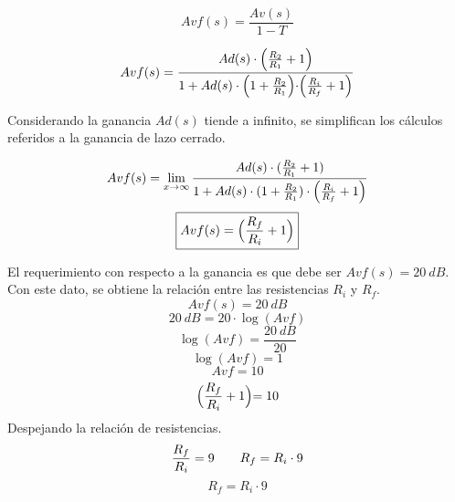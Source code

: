 \begin{equation}
    Avf(s) = \frac{Av(s)}{1-T}
\end{equation}

\begin{equation}
      Avf(s) = \frac{Ad(s)\cdot \Bigl(\frac{R_2}{R_1}+1\Bigl)}{1+Ad(s)\cdot \Bigl(1+\frac{R_2}{R_1}\Bigl)\cdot \Bigl(\frac{R_i}{R_f}+1\Bigl)}
\end{equation}

\bigskip
\hspace{1mm} Considerando la ganancia \(Ad(s)\) tiende a infinito, se simplifican los cálculos referidos a la ganancia de lazo cerrado.

\bigskip
\begin{equation}
      Avf(s) = \lim_{x\to\infty} \frac{Ad(s)\cdot (\frac{R_2}{R_1}+1)}{1+Ad(s)\cdot (1+\frac{R_2}{R_1})\cdot \Bigl(\frac{R_i}{R_f}+1\Bigl)}
\end{equation}
\begin{equation}
    \boxed{
        Avf(s)=\Bigl(\frac{R_f}{R_i}+1\Bigl) 
    }
\end{equation}

\bigskip
\hspace{1mm} El requerimiento con respecto a la ganancia es que debe ser \(Avf(s)=20~dB\). Con este dato, se obtiene la relación entre las resistencias \(R_i\) y \(R_f\).
\begin{equation}
    Avf(s)=20~dB
\end{equation}
\begin{equation}
    20~dB=20\cdot\log{(Avf)}
\end{equation}
\begin{equation}
    \log{(Avf)}=\frac{20~dB}{20}
\end{equation}
\begin{equation}
    \log{(Avf)}=1
\end{equation}
\begin{equation}
    Avf=10
\end{equation}
\begin{equation}
    \Bigl(\frac{R_f}{R_i}+1\Bigl)=10
\end{equation}
\bigskip
\hspace{1mm} Despejando la relación de resistencias.
\bigskip
\begin{equation}
    \frac{R_f}{R_i} = 9 \hspace{7mm} R_f=R_i \cdot 9
\end{equation}
\begin{equation}
    R_f=R_i \cdot 9
\end{equation}

